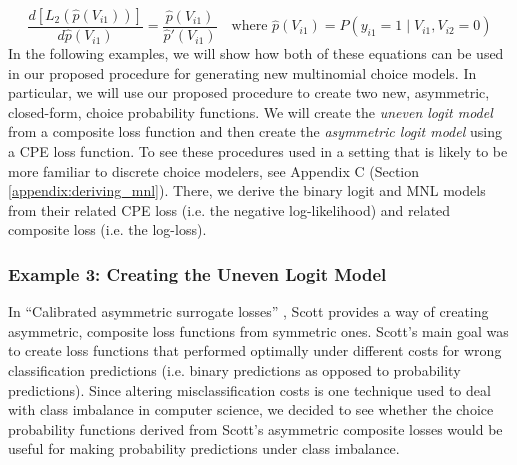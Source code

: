 \begin{equation}
\label{eq:cpe_loss_to_binary_prob}
\frac{d \left[ L_{2} \left( \hat{p} \left( V_{i1} \right) \right) \right]}{d \hat{p} \left( V_{i1} \right)} = \frac{\hat{p} \left( V_{i1} \right) }{ \hat{p}' \left( V_{i1} \right) } \quad \textrm{where } \hat{p} \left( V_{i1} \right) = P \left( y_{i1} = 1 \mid V_{i1}, V_{i2} = 0 \right)
\end{equation}
In the following examples, we will show how both of these equations can be used in our proposed procedure for generating new multinomial choice models. In particular, we will use our proposed procedure to create two new, asymmetric, closed-form, choice probability functions. We will create the \textit{uneven logit model} from a composite loss function and then create the \textit{asymmetric logit model} using a CPE loss function. To see these procedures used in a setting that is likely to be more familiar to discrete choice modelers, see Appendix C (Section \ref{appendix:deriving_mnl}). There, we derive the binary logit and MNL models from their related CPE loss (i.e. the negative log-likelihood) and related composite loss (i.e. the log-loss).

\subsubsection{Example 3: Creating the Uneven Logit Model}
\label{sec:deriving_uneven_logit}
In ``Calibrated asymmetric surrogate losses'' \citep{scott_calibrated_2012}, Scott provides a way of creating asymmetric, composite loss functions from symmetric ones. Scott's main goal was to create loss functions that performed optimally under different costs for wrong classification predictions (i.e. binary predictions as opposed to probability predictions). Since altering misclassification costs is one technique used to deal with class imbalance in computer science, we decided to see whether the choice probability functions derived from Scott's asymmetric composite losses would be useful for making probability predictions under class imbalance. 

